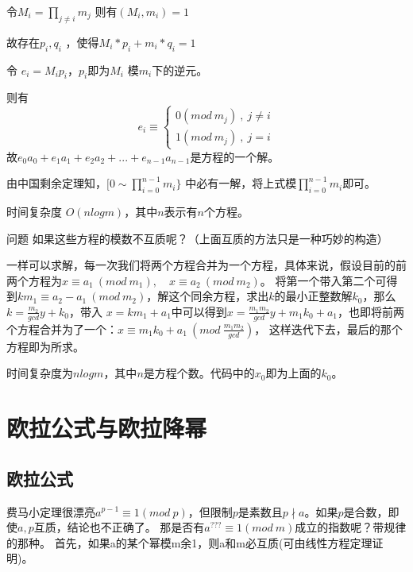 \begin{solution}
	令$M_i=\prod_{j\neq i}m_j$     则有$(M_i,m_i)=1$   
	
	故存在$p_i,q_i$ ，使得$M_i*p_i+m_i*q_i=1$ 
	
	令  $e_i=M_ip_i$，\quad    $p_i$即为$M_i$ 模$m_i$下的逆元。   
	
	则有
$$
e_i\equiv\left\{\begin{matrix}
0(mod\ m_j)\ ,\ j\neq i\\ 
1(mod\ m_j)\ ,\ j=i
\end{matrix}\right.	
$$	
	故$e_0a_0+e_1a_1+e_2a_2+...+e_{n-1}a_{n-1}$是方程的一个解。
	
	由中国剩余定理知，$[0\sim\prod_{i=0}^{n-1}m_i\}$ 中必有一解，将上式模$\prod_{i=0}^{n-1}m_i$即可。 
\end{solution}

时间复杂度  $O(nlogm)$，其中$n$表示有$n$个方程。



\begin{custom}{问题}
	如果这些方程的{\heiti 模数不互质}呢？（上面互质的方法只是一种巧妙的构造）
\end{custom}

一样可以求解，每一次我们将两个方程合并为一个方程，具体来说，假设目前的前两个方程为$x\equiv a_1 \ (mod\ m_1),\quad  x\equiv a_2 \ (mod\ m_2)$。
将第一个带入第二个可得到$km_1\equiv a_2-a_1 \ (mod\ m_2)$，解这个同余方程，求出$k$的最小正整数解$k_0$，那么$k = \frac{m_2}{gcd}y+ k_0$，带入
$x=km_1+a_1$中可以得到$x=\frac{m_1m_2}{gcd}y+m_1k_0+a_1$，也即将前两个方程合并为了一个：$x\equiv m_1k_0+a_1\ (mod\ \frac{m_1m_2}{gcd})$，
这样迭代下去，最后的那个方程即为所求。

时间复杂度为$nlogm$，其中$n$是方程个数。{\heiti 代码中的$x_0$即为上面的$k_0$。}



\section{欧拉公式与欧拉降幂}

\subsection{欧拉公式}

费马小定理很漂亮$a^{p-1}\equiv 1(mod\ p)$，但限制$p$是素数且$p\nmid a$。如果$p$是合数，即使$a,p$互质，结论也不正确了。
那是否有$a^{???}\equiv 1(mod\ m)$成立的指数呢？带规律的那种。
首先，如果a的某个幂模m余1，则a和m必互质(可由线性方程定理证明)。

